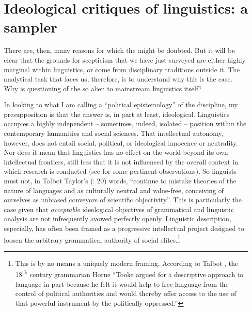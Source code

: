 \documentclass[output=paper]{langscibook}
\begin{document}
\section{Ideological critiques of linguistics: a sampler}
\label{sec:riemer:ideologicalcritiques}

There are, then, many reasons for which the  might be doubted. But it will be clear that the grounds for scepticism that we have just surveyed are either highly marginal within linguistics, or come from disciplinary traditions outside it. The analytical task that faces us, therefore, is to understand why this is the case. Why is questioning of the  so alien to mainstream linguistics itself?

In looking to what I am calling a ``political epistemology'' of the discipline, my presupposition is that the answer is, in part at least, ideological. Linguistics occupies a highly independent -- sometimes, indeed, isolated -- position within the contemporary humanities and social sciences. That intellectual autonomy, however, does not entail social, political, or ideological innocence or neutrality. Nor does it mean that linguistics has no effect on the world beyond its own intellectual frontiers, still less that it is not influenced by the overall context in which research is conducted (see \citealt[182]{Joseph2002} for some pertinent observations). So linguists must not, in Talbot Taylor's (\citeyear{Taylor1990}: 20) words, ``continue to mistake theories of the nature of languages and  as culturally neutral and value-free, conceiving of ourselves as unbiased conveyors of scientific objectivity''. This is particularly the case given that \emph{acceptable} ideological objectives of grammatical and linguistic analysis are not infrequently avowed perfectly openly. Linguistic description, especially, has often been framed as a progressive intellectual project designed to loosen the arbitrary grammatical authority of social elites.\footnote{This is by no means a uniquely modern framing. According to Talbot \citet[11]{Taylor1990}, the 18\textsuperscript{th} century grammarian Horne ``Tooke argued for a descriptive approach to language in part because he felt it would help to free language from the control of political authorities and would thereby offer access to the use of that powerful instrument by the politically oppressed.''}
\end{document}
